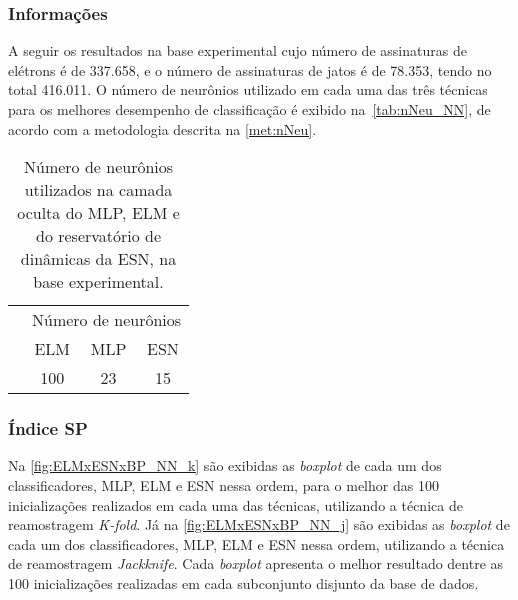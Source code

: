 \subsubsection{Informações}
A seguir os resultados na base experimental cujo número de assinaturas de elétrons é de 337.658, e o número de assinaturas de jatos é de 78.353, tendo no total 416.011. O número de neurônios utilizado em cada uma das três técnicas para os melhores desempenho de classificação é exibido na~\autoref{tab:nNeu_NN}, de acordo com a metodologia descrita na \autoref{met:nNeu}. 


\begin{table}[ht]%
	\centering
	\caption{Número de neurônios utilizados na camada oculta do MLP, ELM e do reservatório de dinâmicas da ESN, na base experimental.}
	\label{tab:nNeu_NN}
	\begin{small}
	\setlength{\extrarowheight}{3pt}       %
	\begin{tabular}{c*{3}c} \toprule
		& \multicolumn{3}{c}{Número de neurônios} \\ \cmidrule(lr){2-4}
		& {ELM} & {MLP} & {ESN} \\ \cmidrule(lr){2-2}\cmidrule(lr){3-3}\cmidrule(lr){4-4}
		&  100  &  23   &  15   \\ \bottomrule
	\end{tabular}%
	\end{small}
\end{table}%



\subsubsection{Índice SP}

Na \autoref{fig:ELMxESNxBP_NN_k} são exibidas as \textit{boxplot} de cada um dos classificadores, MLP, ELM e ESN nessa ordem, para o melhor das 100 inicializações realizados em cada uma das técnicas, utilizando a técnica de reamostragem \textit{K-fold}. Já na \autoref{fig:ELMxESNxBP_NN_j} são exibidas as \textit{boxplot} de cada um dos classificadores, MLP, ELM e ESN nessa ordem, utilizando a técnica de reamostragem \textit{Jackknife}. Cada \textit{boxplot} apresenta o melhor resultado dentre as 100 inicializações realizadas em cada subconjunto disjunto da base de dados. 

